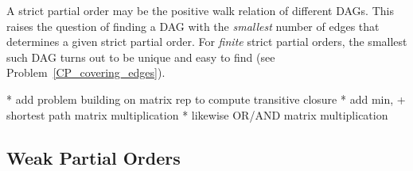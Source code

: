 A strict partial order may be the positive walk relation of different
DAGs.  \iffalse The divisibility partial order can also be more
economically represented by the walk relation in a DAG.
\hyperdef{divisibility}{DAG}{A DAG whose \emph{path} relation is
  divisibility} on $\set{1,2,\dots,12}$ is shown in
Figure~\ref{fig:divisibility-DAG}; the arrowheads are omitted in the
Figure, and edges are understood to point upwards.

\begin{figure}
\graphic{divi2}
\caption{A DAG whose Walk Relation is Divisibility on $\set{1,2,\dots,12}$.}
\label{fig:divisibility-DAG}
\end{figure}

If we're using a DAG to represent a partial order---so all we care
about is the walk relation of the DAG---we could replace the DAG with
any other DAG with the same walk relation.  \fi This raises the
question of finding a DAG with the \emph{smallest} number of edges
that determines a given strict partial order.  For \emph{finite}
strict partial orders, the smallest such DAG turns out to be unique
and easy to find (see Problem~\ref{CP_covering_edges}).

\begin{problems}
\practiceproblems
{}

\classproblems
{}

\homeworkproblems
{}

\end{problems}

\begin{editingnotes}
* add problem building on matrix rep to compute transitive closure
* add min, + shortest path matrix  multiplication
* likewise OR/AND matrix multiplication
\end{editingnotes}


\iffalse
\subsection{Weak Partial Orders}\label{partial_order_sec}

